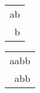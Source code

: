 \begin{tabular}{|l|} \hline
ab \\
\ b \\
\hline
\end{tabular} 
\begin{tabular}{|l|} \hline
aabb \\
\ abb \\
\hline
\end{tabular} 
